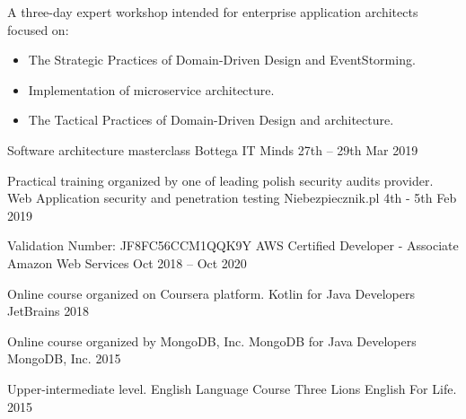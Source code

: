 

\begin{cventries}

  \cventry
    {A three-day expert workshop intended for enterprise application architects focused on: 
\begin{itemize}
  \item The Strategic Practices of Domain-Driven Design and EventStorming.
  \item Implementation of microservice architecture.
  \item The Tactical Practices of Domain-Driven Design and architecture. 
\end{itemize}\vspace*{-\baselineskip} } %
    {Software architecture masterclass} %
    {Bottega IT Minds} %
    {27th – 29th Mar 2019} %
    {}

  \cventry
    {Practical training organized by one of leading polish security audits provider. } %
    {Web Application security and penetration testing} %
    {Niebezpiecznik.pl} %
    {4th - 5th Feb 2019} %
    {}

  \cventry
    {Validation Number: JF8FC56CCM1QQK9Y} %
    {AWS Certified Developer - Associate} %
    {Amazon Web Services} %
    {Oct 2018 – Oct 2020} %
    {}
   
    
  \cventry
    {Online course organized on Coursera platform. } %
    {Kotlin for Java Developers} %
    {JetBrains} %
    {2018} %
    {}
    
  \cventry
    {Online course organized by MongoDB, Inc. } %
    {MongoDB for Java Developers} %
    {MongoDB, Inc.} %
    {2015} %
    {}
    
  \cventry
    {Upper-intermediate level.} %
    {English Language Course} %
    {Three Lions English For Life.} %
    {2015} %
    {}

\end{cventries}
